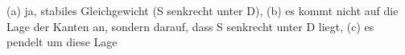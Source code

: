 (a) ja, stabiles Gleichgewicht (S senkrecht unter D), (b) es kommt nicht auf die Lage der Kanten an, sondern darauf, dass S senkrecht unter D liegt, (c) es pendelt um diese Lage
